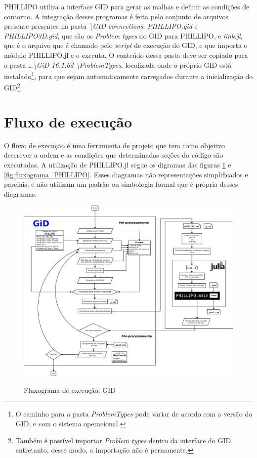 PHILLIPO utiliza a interface GID para gerar as malhas e definir as condições de contorno. A integração desses programas é feita pelo conjunto de arquivos presente presentes na pasta \emph{\textbackslash GID connections}: \emph{PHILLIPO.gid} e \emph{PHILLIPO3D.gid}, que são os \emph{Problem types} do GID para PHILLIPO, e \emph{link.jl}, que é o arquivo que é chamado pelo \emph{script} de execução do GID, e que importa o módulo PHILLIPO.jl e o executa. O conteúdo dessa pasta deve ser copiado para a pasta \emph{\dots\textbackslash GiD 16.1.6d \textbackslash ProblemTypes}, localizada onde o próprio GID está instalado\footnote{O caminho para a pasta \emph{ProblemTypes} pode variar de acordo com a versão do GID, e com o sistema operacional.}, para que sejam automaticamente carregados durante a inicialização do GID\footnote{Também é possível importar \emph{Problem types} dentro da interface do GID, entretanto, desse modo, a importação não é permanente.}.

\section{Fluxo de execução}

O fluxo de execução é uma ferramenta de projeto que tem como objetivo descrever a ordem e as condições que determinadas seções do código são executadas. A utilização de PHILLIPO.jl segue os digramas das figuras \ref{fig:fluxograma_GID} e \ref{fig:fluxograma_PHILLIPO}. Esses diagramas não representações simplificados e parciais, e não utilizam um padrão ou simbologia formal que é própria desses diagramas.
\begin{figure}[hbtp]
    \centering
    \caption{Fluxograma de execução: GID}
    \includegraphics[width = \textwidth]{Figuras/fluxograma_GID.pdf}
    \label{fig:fluxograma_GID}
\end{figure}


